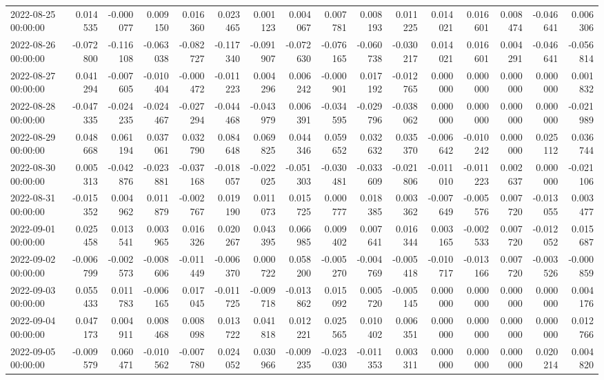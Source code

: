\begin{tabular}{lrrrrrrrrrrrrrrr}
2022-08-25 00:00:00 & 0.014535 & -0.000077 & 0.009150 & 0.016360 & 0.023465 & 0.001123 & 0.004067 & 0.007781 & 0.008193 & 0.011225 & 0.014021 & 0.016601 & 0.008474 & -0.046641 & 0.006306 \\
2022-08-26 00:00:00 & -0.072800 & -0.116108 & -0.063038 & -0.082727 & -0.117340 & -0.091907 & -0.072630 & -0.076165 & -0.060738 & -0.030217 & 0.014021 & 0.016601 & 0.004291 & -0.046641 & -0.056814 \\
2022-08-27 00:00:00 & 0.041294 & -0.007605 & -0.010404 & -0.000472 & -0.011223 & 0.004296 & 0.006242 & -0.000901 & 0.017192 & -0.012765 & 0.000000 & 0.000000 & 0.000000 & 0.000000 & 0.001832 \\
2022-08-28 00:00:00 & -0.047335 & -0.024235 & -0.024467 & -0.027294 & -0.044468 & -0.043979 & 0.006391 & -0.034595 & -0.029796 & -0.038062 & 0.000000 & 0.000000 & 0.000000 & 0.000000 & -0.021989 \\
2022-08-29 00:00:00 & 0.048668 & 0.061194 & 0.037061 & 0.032790 & 0.084648 & 0.069825 & 0.044346 & 0.059652 & 0.032632 & 0.035370 & -0.006642 & -0.010242 & 0.000000 & 0.025112 & 0.036744 \\
2022-08-30 00:00:00 & 0.005313 & -0.042876 & -0.023881 & -0.037168 & -0.018057 & -0.022025 & -0.051303 & -0.030481 & -0.033609 & -0.021806 & -0.011010 & -0.011223 & 0.002637 & 0.000000 & -0.021106 \\
2022-08-31 00:00:00 & -0.015352 & 0.004962 & 0.011879 & -0.002767 & 0.019190 & 0.011073 & 0.015725 & 0.000777 & 0.018385 & 0.003362 & -0.007649 & -0.005576 & 0.007720 & -0.013055 & 0.003477 \\
2022-09-01 00:00:00 & 0.025458 & 0.013541 & 0.003965 & 0.016326 & 0.020267 & 0.043395 & 0.066985 & 0.009402 & 0.007641 & 0.016344 & 0.003165 & -0.002533 & 0.007720 & -0.012052 & 0.015687 \\
2022-09-02 00:00:00 & -0.006799 & -0.002573 & -0.008606 & -0.011449 & -0.006370 & 0.000722 & 0.058200 & -0.005270 & -0.004769 & -0.005418 & -0.010717 & -0.013166 & 0.007720 & -0.003526 & -0.000859 \\
2022-09-03 00:00:00 & 0.055433 & 0.011783 & -0.006165 & 0.017045 & -0.011725 & -0.009718 & -0.013862 & 0.015092 & 0.005720 & -0.005145 & 0.000000 & 0.000000 & 0.000000 & 0.000000 & 0.004176 \\
2022-09-04 00:00:00 & 0.047173 & 0.004911 & 0.008468 & 0.008098 & 0.013722 & 0.041818 & 0.012221 & 0.025565 & 0.010402 & 0.006351 & 0.000000 & 0.000000 & 0.000000 & 0.000000 & 0.012766 \\
2022-09-05 00:00:00 & -0.009579 & 0.060471 & -0.010562 & -0.007780 & 0.024052 & 0.030966 & -0.009235 & -0.023030 & -0.011353 & 0.003311 & 0.000000 & 0.000000 & 0.000000 & 0.020214 & 0.004820 \\

\end{tabular}
